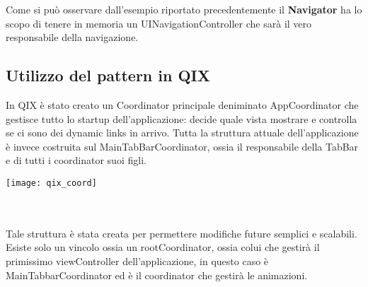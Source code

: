 Come si può osservare dall'esempio riportato precedentemente il \textbf{Navigator}
ha lo scopo di tenere in memoria un UINavigationController che sarà il vero 
responsabile della navigazione.

\subsection{Utilizzo del pattern in QIX}

In QIX è stato creato un Coordinator principale deniminato AppCoordinator che gestisce
tutto lo startup dell'applicazione: decide quale vista mostrare e controlla se ci sono dei dynamic links in arrivo.
Tutta la struttura attuale dell'applicazione è invece costruita sul MainTabBarCoordinator, ossia il responsabile
della TabBar e di tutti i coordinator suoi figli.\\

\begin{minipage}{\linewidth}
    \centering
    \texttt{[image: qix\_coord]}
    \label{fig:6}
\end{minipage}\\ \\

Tale struttura è stata creata per permettere modifiche future semplici e scalabili.
Esiste solo un vincolo ossia un rootCoordinator, ossia colui che gestirà il primissimo viewController dell'applicazione, in questo caso è MainTabbarCoordinator ed è il
coordinator che gestirà le animazioni.